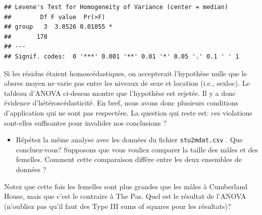 \documentclass[12pt,]{book}
\newenvironment{Shaded}{\begin{snugshade}}{\end{snugshade}}
\newcommand{\DataTypeTok}[1]{\textcolor[rgb]{0.27,0.27,0.27}{#1}}
\newcommand{\DecValTok}[1]{\textcolor[rgb]{0.06,0.06,0.06}{#1}}
\newcommand{\KeywordTok}[1]{\textcolor[rgb]{0.27,0.27,0.27}{\textbf{#1}}}
\newcommand{\NormalTok}[1]{#1}
\newcommand{\OperatorTok}[1]{\textcolor[rgb]{0.43,0.43,0.43}{\textbf{#1}}}
\newcommand{\StringTok}[1]{\textcolor[rgb]{0.5,0.5,0.5}{#1}}
\providecommand{\tightlist}{%
  \setlength{\itemsep}{0pt}\setlength{\parskip}{0pt}}
\begin{document}
\begin{verbatim}
## Levene's Test for Homogeneity of Variance (center = median)
##        Df F value  Pr(>F)  
## group   3  3.8526 0.01055 *
##       178                  
## ---
## Signif. codes:  0 '***' 0.001 '**' 0.01 '*' 0.05 '.' 0.1 ' ' 1
\end{verbatim}

Si les résidus étaient homoscédastiques, on accepterait l'hypothèse nulle que le absres moyen ne varie pas entre les niveaux de sexe et location (i.e., sexloc). Le tableau d'ANOVA ci-dessus montre que l'hypothèse est rejetée. Il y a donc évidence d'hétéroscédasticité. En bref, nous avons donc plusieurs conditions d'application qui ne sont pas respectées. La question qui reste est: ces violations sont-elles suffisantes pour invalider nos conclusions ?

\begin{itemize}
\tightlist
\item
  Répétez la même analyse avec les données du fichier \texttt{stu2mdat.csv} . Que concluez-vous? Supposons que vous vouliez comparer la taille des mâles et des femelles. Comment cette comparaison diffère entre les deux ensembles de données ?
\end{itemize}

Notez que cette fois les femelles sont plus grandes que les mâles à Cumberland House, mais que c'est le contraire à The Pas. Quel est le résultat de l'ANOVA (n'oubliez pas qu'il faut des Type III sums of squares pour les résultats)?
\end{document}
